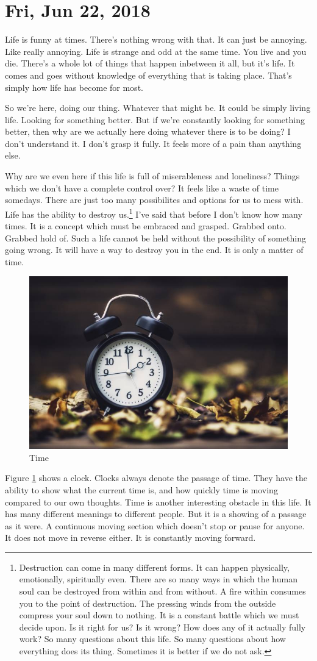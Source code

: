 \section{Fri, Jun 22, 2018}

Life is funny at times. There's nothing wrong with that. It can just be
annoying. Like really annoying. Life is strange and odd at the same time. You
live and you die. There's a whole lot of things that happen inbetween it all,
but it's life. It comes and goes without knowledge of everything that is taking
place. That's simply how life has become for most.

So we're here, doing our thing. Whatever that might be. It could be simply
living life. Looking for something better. But if we're constantly looking for
something better, then why are we actually here doing whatever there is to be
doing? I don't understand it. I don't grasp it fully. It feels more of a pain
than anything else.

Why are we even here if this life is full of miserableness and loneliness?
Things which we don't have a complete control over? It feels like a waste of
time somedays. There are just too many possibilites and options for us to mess
with. Life has the ability to destroy us.\footnote{
Destruction can come in many different forms. It can happen physically,
emotionally, spiritually even. There are so many ways in which the human soul
can be destroyed from within and from without. A fire within consumes you to the
point of destruction. The pressing winds from the outside compress your soul
down to nothing. It is a constant battle which we must decide upon. Is it right
for us? Is it wrong? How does any of it actually fully work? So many questions
about this life. So many questions about how everything does its thing.
Sometimes it is better if we do not ask.
} I've said that before I don't know how many times. It is a concept which must
be embraced and grasped. Grabbed onto. Grabbed hold of. Such a life cannot be
held without the possibility of something going wrong. It will have a way to
destroy you in the end. It is only a matter of time.

\begin{figure}[h!]
  \centering
  \includegraphics[width=0.2\linewidth]{2018/images/time.jpg}
  \caption{Time}
  \label{fig:time}
\end{figure}

Figure \ref{fig:time} shows a clock. Clocks always denote the passage of time. 
They have the ability to show what the current time is, and how quickly time
is moving compared to our own thoughts. Time is another interesting obstacle in 
this life. It has many different meanings to different people. But it is a 
showing of a passage as it were. A continuous moving section which doesn't stop 
or pause for anyone. It does not move in reverse either. It is constantly moving 
forward.
